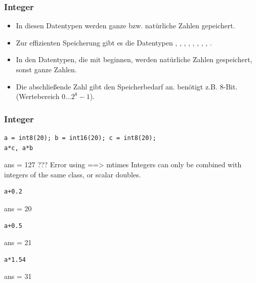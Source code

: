 \documentclass[hyperref={xetex}]{beamer}
\begin{document}
%
%
\begin{frame}[fragile]\frametitle{Integer}
\begin{itemize}
\item In diesen Datentypen werden ganze bzw. nat\"urliche Zahlen gepeichert.  
\item Zur effizienten Speicherung gibt es die Datentypen ,
, , , , ,
, , . 
\item In den Datentypen, die mit  beginnen, werden nat\"urliche Zahlen
gespeichert, sonst ganze Zahlen.
\item Die abschlie{\ss}ende Zahl gibt den Speicherbedarf an. 
ben\"otigt z.B. $8$-Bit. (Wertebereich $0 \dots 2^8-1$).
\end{itemize}
\end{frame}
%
%
\begin{frame}[fragile]\frametitle{Integer}
\begin{lstlisting}
a = int8(20); b = int16(20); c = int8(20);
a*c, a*b
\end{lstlisting}
\begin{matlab}
ans =  127
??? Error using ==> mtimes
Integers can only be combined with integers
of the same class, or scalar doubles.
\end{matlab}
\begin{lstlisting}
a+0.2
\end{lstlisting}
\begin{matlab}
ans =   20
\end{matlab}
\begin{lstlisting}
a+0.5
\end{lstlisting}
\begin{matlab}
ans =   21
\end{matlab}
\begin{lstlisting}
a*1.54
\end{lstlisting}
\begin{matlab}
ans =   31
\end{matlab}
\end{frame}
%
%
%
\end{document}
